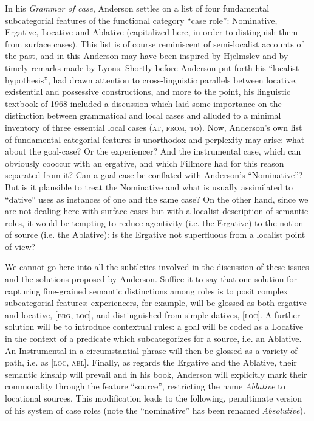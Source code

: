 \documentclass[english,output=paper,colorlinks,citecolor=brown]{../langscibook}
\begin{document}
In his \textit{Grammar of case}, Anderson settles on a list of four fundamental subcategorial features of the functional category ``case role'': Nominative, Ergative, Locative and Ablative (capitalized here, in order to distinguish them from surface cases). This list is of course reminiscent of semi-localist accounts of the past, and in this Anderson may have been inspired by Hjelmslev and by timely remarks made by Lyons. Shortly before Anderson put forth his “localist hypothesis”, \citet{Lyons1967} had drawn attention to cross-linguistic parallels between locative, existential and possessive constructions, and more to the point, his linguistic textbook of 1968 included a discussion which laid some importance on the distinction between grammatical and local cases and alluded to a minimal inventory of three essential local cases (\textsc{at}, \textsc{from}, \textsc{to}). Now, Anderson’s own list of fundamental categorial features is unorthodox and perplexity may arise: what about the goal-case? Or the experiencer? And the instrumental case, which can obviously cooccur with an ergative, and which Fillmore had for this reason separated from it? Can a goal-case be conflated with Anderson’s ``Nominative''? But is it plausible to treat the Nominative and what is usually assimilated to ``dative'' uses as instances of one and the same case? On the other hand, since we are not dealing here with surface cases but with a localist description of semantic roles, it would be tempting to reduce agentivity (i.e. the Ergative) to the notion of source (i.e. the Ablative): is the Ergative not superfluous from a localist point of view?

We cannot go here into all the subtleties involved in the discussion of these issues and the solutions proposed by Anderson. Suffice it to say that one solution for capturing fine-grained semantic distinctions among roles is to posit complex subcategorial features: experiencers, for example, will be glossed as both ergative and locative, [\textsc{erg}, \textsc{loc}], and distinguished from simple datives, [\textsc{loc}]. A further solution will be to introduce contextual rules: a goal will be coded as a Locative in the context of a predicate which subcategorizes for a source, i.e. an Ablative. An Instrumental in a circumstantial phrase will then be glossed as a variety of path, i.e. as [\textsc{loc}, \textsc{abl}]. Finally, as regards the Ergative and the Ablative, their semantic kinship will prevail and in his \citeyear{Anderson1977} book, Anderson will explicitly mark their commonality through the feature ``source'', restricting the name \textit{Ablative} to locational sources. This modification leads to the following, penultimate version of his system of case roles (note the ``nominative'' has been renamed \textit{Absolutive}).
\end{document}
